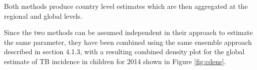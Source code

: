 Both methods produce country level estimates which are then aggregated at the regional and global levels.

Since the two methods can be assumed independent in their approach to estimate the same parameter, they have been combined using the same ensemble approach described in section 4.1.3, with a resulting combined density plot for the global estimate of TB incidence in children for 2014 shown in Figure \ref{fig:cdens}.

